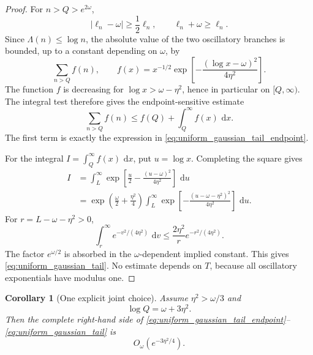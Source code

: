 \documentclass[11pt]{amsart}
\numberwithin{equation}{section}
\theoremstyle{plain}
\newtheorem{corollary}[theorem]{Corollary}
\theoremstyle{definition}
\theoremstyle{remark}
\newcommand{\1}{\mathbf{1}}
\newcommand{\dd}{\,\mathrm{d}}
\begin{document}
\begin{proof}
For \(n>Q>e^{2\omega}\),
\begin{equation}
|\ell_n-\omega|\geq\frac12\ell_n,
\qquad
\ell_n+\omega\geq\ell_n.
\label{eq:tail_denominator_bounds_detailed}
\end{equation}
Since \(\Lambda(n)\leq\log n\), the absolute value of the two oscillatory
branches is bounded, up to a constant depending on \(\omega\), by
\begin{equation}
\sum_{n>Q}f(n),
\qquad
f(x)
=
x^{-1/2}
\exp\left[-\frac{(\log x-\omega)^2}{4\eta^2}\right].
\label{eq:tail_integer_sum_detailed}
\end{equation}
The function \(f\) is decreasing for
\(\log x>\omega-\eta^2\), hence in particular on \([Q,\infty)\).
The integral test therefore gives the endpoint-sensitive estimate
\begin{equation}
\sum_{n>Q}f(n)
\leq
f(Q)+\int_Q^\infty f(x)\,\dd x.
\label{eq:tail_sum_endpoint_integral}
\end{equation}
The first term is exactly the expression in
\eqref{eq:uniform_gaussian_tail_endpoint}.

For the integral \(I=\int_Q^\infty f(x)\,\dd x\), put \(u=\log x\).
Completing the square gives
\begin{align}
I
&=
\int_L^\infty
\exp\left[
\frac u2-
\frac{(u-\omega)^2}{4\eta^2}
\right]\,\dd u
\label{eq:tail_square_one}
\\
&=
\exp\left(\frac\omega2+\frac{\eta^2}{4}\right)
\int_L^\infty
\exp\left[-
\frac{(u-\omega-\eta^2)^2}{4\eta^2}
\right]\,\dd u.
\label{eq:tail_square_two}
\end{align}
For \(r=L-\omega-\eta^2>0\),
\begin{equation}
\int_r^\infty e^{-v^2/(4\eta^2)}\,\dd v
\leq
\frac{2\eta^2}{r}e^{-r^2/(4\eta^2)}.
\label{eq:gaussian_tail_elementary}
\end{equation}
The factor \(e^{\omega/2}\) is absorbed in the
\(\omega\)-dependent implied constant.  This gives
\eqref{eq:uniform_gaussian_tail}.  No estimate depends on \(T\), because
all oscillatory exponentials have modulus one.
\end{proof}

\begin{corollary}[One explicit joint choice]
\label{cor:joint_Q_eta_choice}
Assume \(\eta^2>\omega/3\) and
\begin{equation}
\log Q=\omega+3\eta^2.
\label{eq:joint_Q_eta_choice}
\end{equation}
Then the complete right-hand side of
\eqref{eq:uniform_gaussian_tail_endpoint}--
\eqref{eq:uniform_gaussian_tail} is
\begin{equation}
O_\omega(e^{-3\eta^2/4}).
\label{eq:joint_Q_eta_decay}
\end{equation}
\end{corollary}
\end{document}
